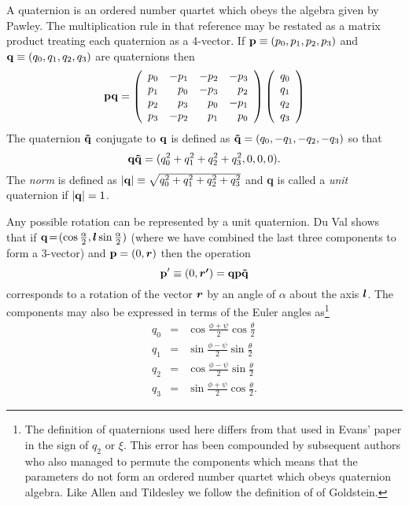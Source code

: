 \documentclass[twoside]{report}
\newcommand{\bm}[1]{\mbox{\boldmath \protect\(#1\protect\)}}
\begin{document}
A quaternion  is an ordered number  quartet  which obeys  the  algebra
given  by   Pawley\cite{pawley:81}.  The multiplication   rule in that
reference may be restated as a matrix product treating each quaternion
as a  4-vector.  If  ${\bf p} \equiv (p_0,p_1,p_2,p_3)$ and  ${\bf q}
\equiv  (q_0,q_1,q_2,q_3)$  are quaternions then
\begin{equation}
{\bf pq} = 
\left(
\begin{array}{rrrr}
p_0 & -p_1 & -p_2 & -p_3 \\
p_1 &  p_0 & -p_3 &  p_2 \\
p_2 &  p_3 &  p_0 & -p_1 \\
p_3 & -p_2 &  p_1 &  p_0 
\end{array}
\right) \left(
\begin{array}{r}
q_0 \\ q_1 \\ q_2 \\ q_3
\end{array}
\right)
\end{equation}
The quaternion $ {\bf \tilde{q}} $ conjugate to ${\bf q}$ is defined
as ${\bf \tilde{q}} = (q_0,-q_1,-q_2,-q_3)$ so that
\begin{equation}
{\bf q\tilde{q}} = (q_0^2+q_1^2+q_2^2+q_3^2,0,0,0).
\label{eqn:qnorm}
\end{equation}
The {\em norm\/} is defined as $ |{\bf q}| \equiv
\sqrt{q_0^2+q_1^2+q_2^2+q_3^2} $ and {\bf q} is called a {\em unit\/}
quaternion if $ |{\bf q}| = 1 $.  

Any possible rotation can be represented by a unit quaternion. Du Val 
shows\cite{duval:64} that if $ {\bf q} \! = \! (\cos \frac{\alpha}{2}, \bm{l} \sin
\frac{\alpha}{2}) $ (where we have combined the last three components to form
a 3-vector) and ${\bf p} = (0,\bm{r})$ then the operation
\begin{equation}
{\bf p'} \equiv (0,\bm{r'}) = {\bf q p \tilde{q}}
\end{equation}
corresponds to a rotation of the vector $\bm{r}$ by an angle of
$\alpha$ about the axis $\bm{l}$.  The components may also be
expressed in terms of the Euler angles as\footnote{The definition of
quaternions used here differs from that used in Evans' paper\cite[equation 21]{evans:77} in the sign of $q_2$ or $\xi$.  This
error has been compounded by subsequent authors\cite{sonnenschein:85,smith:82,laakonsen:85} who also managed to 
permute the components which means that the parameters do not form an
ordered number quartet which obeys quaternion algebra. Like Allen and
Tildesley\cite[page 88]{allen:87} we follow the definition of of
Goldstein\cite[pages 143 and 155]{goldstein:80}.}
\begin{eqnarray}
q_0 & = & \cos \frac{\phi+\psi}{2} \cos \frac{\theta}{2} \nonumber \\
q_1 & = & \sin \frac{\phi-\psi}{2} \sin \frac{\theta}{2} \nonumber \\
q_2 & = & \cos \frac{\phi-\psi}{2} \sin \frac{\theta}{2} \nonumber \\
q_3 & = & \sin \frac{\phi+\psi}{2} \cos \frac{\theta}{2}.
\end{eqnarray}
\end{document}
